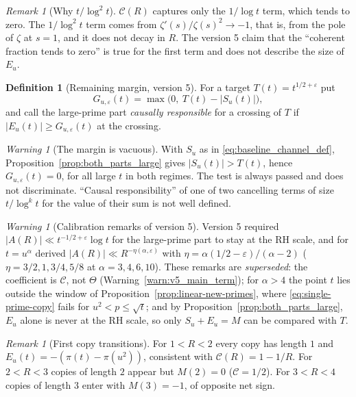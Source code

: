 \documentclass[11pt]{amsart}
\numberwithin{equation}{section}
\theoremstyle{plain}
\theoremstyle{definition}
\newtheorem{definition}[theorem]{Definition}
\theoremstyle{remark}
\newtheorem{remark}[theorem]{Remark}
\newtheorem{warning}[theorem]{Warning}
\newcommand{\eps}{\varepsilon}
\newcommand{\Cc}{\mathcal{C}}
\begin{document}
\begin{remark}[Why $t/\log^2t$]
\label{rem:why_log2}
$\Cc(R)$ captures only the $1/\log t$ term, which tends to zero. The
$1/\log^2t$ term comes from $\zeta'(s)/\zeta(s)^2\to-1$, that is, from the
pole of $\zeta$ at $s=1$, and it does not decay in $R$. The version 5 claim
that the ``coherent fraction tends to zero'' is true for the first term and
does not describe the size of $E_u$.
\end{remark}

\begin{definition}[Remaining margin, version 5]
\label{def:remaining-margin}
For a target $T(t)=t^{1/2+\eps}$ put
\begin{equation}
\label{eq:margin-def}
  G_{u,\eps}(t)=\max\bigl(0,\ T(t)-|S_u(t)|\bigr),
\end{equation}
and call the large-prime part \emph{causally responsible} for a crossing of
$T$ if $|E_u(t)|\ge G_{u,\eps}(t)$ at the crossing.
\end{definition}

\begin{warning}[The margin is vacuous]
\label{warn:margin_vacuous}
With $S_u$ as in \eqref{eq:baseline_channel_def},
Proposition~\ref{prop:both_parts_large} gives $|S_u(t)|>T(t)$, hence
$G_{u,\eps}(t)=0$, for all large $t$ in both regimes. The test is always
passed and does not discriminate. ``Causal responsibility'' of one of two
cancelling terms of size $t/\log^kt$ for the value of their sum is not well
defined.
\end{warning}

\begin{warning}[Calibration remarks of version 5]
\label{warn:v5_calibration}
Version 5 required $|A(R)|\ll t^{-1/2+\eps}\log t$ for the large-prime part
to stay at the RH scale, and for $t=u^\alpha$ derived
$|A(R)|\ll R^{-\eta(\alpha,\eps)}$ with
$\eta=\alpha(1/2-\eps)/(\alpha-2)$ ($\eta=3/2,1,3/4,5/8$ at
$\alpha=3,4,6,10$). These remarks are \emph{superseded}: the coefficient is
$\Cc$, not $\Theta$ (Warning~\ref{warn:v5_main_term}); for $\alpha>4$ the
point $t$ lies outside the window of
Proposition~\ref{prop:linear-new-primes}, where
\eqref{eq:single-prime-copy} fails for $u^2<p\le\sqrt t$; and by
Proposition~\ref{prop:both_parts_large}, $E_u$ alone is never at the RH
scale, so only $S_u+E_u=M$ can be compared with $T$.
\end{warning}

\begin{remark}[First copy transitions]
\label{rem:first-copy-transitions}
For $1<R<2$ every copy has length $1$ and
$E_u(t)=-(\pi(t)-\pi(u^2))$, consistent with $\Cc(R)=1-1/R$. For $2<R<3$
copies of length $2$ appear but $M(2)=0$ ($\Cc=1/2$). For $3<R<4$ copies of
length $3$ enter with $M(3)=-1$, of opposite net sign.
\end{remark}
\end{document}
